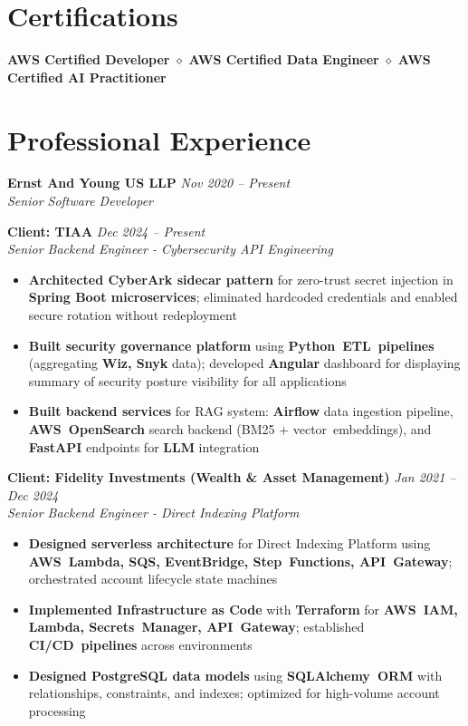 \documentclass[11pt,a4paper]{article}
\newcommand{\resumeItem}[1]{\item\small{#1}}
\newcommand{\resumeItemList}[1]{\begin{itemize}[leftmargin=0.5in, itemsep=0.25em, parsep=0pt, partopsep=0pt, topsep=0.25em]
    \small
    #1
\end{itemize}}
\begin{document}
\section{Certifications}
\begin{center}
    \small\textbf{AWS Certified Developer} \hspace{0.3em} $\diamond$ \hspace{0.3em} \textbf{AWS Certified Data Engineer} \hspace{0.3em} $\diamond$ \hspace{0.3em} \textbf{AWS Certified AI Practitioner}
\end{center}

\section{Professional Experience}

\textbf{Ernst And Young US LLP} \hfill \textit{Nov 2020 -- Present}\\
\textit{Senior Software Developer}

\textbf{Client: TIAA} \hfill \textit{Dec 2024 -- Present}\\
\textit{Senior Backend Engineer - Cybersecurity API Engineering}
\resumeItemList{
    \resumeItem{\textbf{Architected CyberArk sidecar pattern} for zero-trust secret injection in \textbf{Spring Boot microservices}; eliminated hardcoded credentials and enabled secure rotation without redeployment}
    \resumeItem{\textbf{Built security governance platform} using \textbf{Python~ETL~pipelines} (aggregating \textbf{Wiz, Snyk} data); developed \textbf{Angular} dashboard for displaying summary of security posture visibility for all applications}
    \resumeItem{\textbf{Built backend services} for RAG system: \textbf{Airflow} data ingestion pipeline, \textbf{AWS~OpenSearch} search backend (BM25 + vector~embeddings), and \textbf{FastAPI} endpoints for \textbf{LLM} integration}
}
\vspace{0.4em}

\textbf{Client: Fidelity Investments (Wealth \& Asset Management)} \hfill \textit{Jan 2021 -- Dec 2024}\\
\textit{Senior Backend Engineer - Direct Indexing Platform}
\resumeItemList{
    \resumeItem{\textbf{Designed serverless architecture} for Direct Indexing Platform using \textbf{AWS~Lambda, SQS, EventBridge, Step~Functions, API~Gateway}; orchestrated account lifecycle state machines}
    \resumeItem{\textbf{Implemented Infrastructure as Code} with \textbf{Terraform} for \textbf{AWS~IAM, Lambda, Secrets~Manager, API~Gateway}; established \textbf{CI/CD~pipelines} across environments}
    \resumeItem{\textbf{Designed PostgreSQL data models} using \textbf{SQLAlchemy~ORM} with relationships, constraints, and indexes; optimized for high-volume account processing}
}
\vspace{0.4em}
\end{document}
